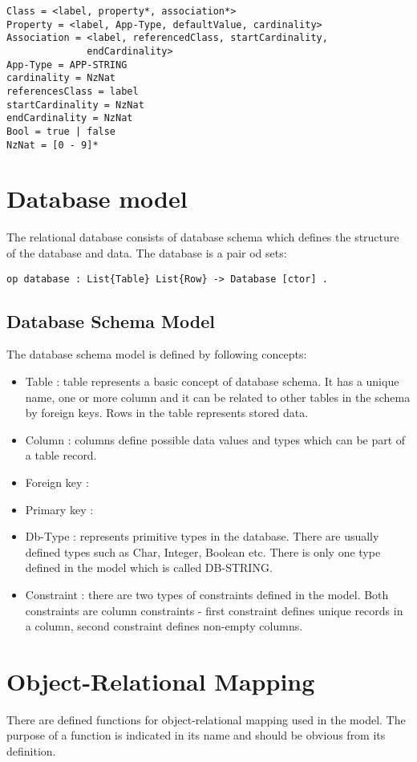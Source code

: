 \documentclass[11pt]{article}
\begin{document}
\begin{verbatim}
Class = <label, property*, association*>
Property = <label, App-Type, defaultValue, cardinality>
Association = <label, referencedClass, startCardinality, 
              endCardinality>
App-Type = APP-STRING 
cardinality = NzNat
referencesClass = label
startCardinality = NzNat
endCardinality = NzNat
Bool = true | false
NzNat = [0 - 9]*
\end{verbatim}

\section{Database model}
The relational database consists of database schema which defines the structure of the database and data. The database is a pair od sets:
\begin{verbatim}
op database : List{Table} List{Row} -> Database [ctor] .
\end{verbatim}

\subsection{Database Schema Model}
The database schema model is defined by following concepts:
\begin{itemize}
	\item Table : table represents a basic concept of database schema. It has a unique name, one or more column and it can be related to other tables in the schema by foreign keys. Rows in the table represents stored data.
	\item Column : columns define possible data values and types which can be part of a table record.
	\item Foreign key :
	\item Primary key :
	\item Db-Type : represents primitive types in the database. There are usually defined types such as Char, Integer, Boolean etc. There is only one type defined in the model which is called DB-STRING.
	\item Constraint : there are two types of constraints defined in the model. Both constraints are column constraints - first constraint defines unique records in a column, second constraint defines non-empty columns.
\end{itemize}

	


\newpage
\appendix
\section{Object-Relational Mapping}
There are defined functions for object-relational mapping used in the model. The purpose of a function is indicated in its name and should be obvious from its definition.
\end{document}
